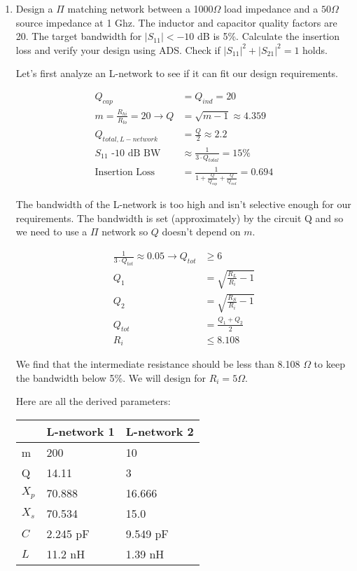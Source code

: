 \begin{enumerate}[label=(\alph*)]
    \item {\color{blue}Design a $\Pi$ matching network between a 1000$\Omega$ load impedance and a $50 \Omega$ source impedance at 1 Ghz. The inductor and capacitor quality factors are 20. The target bandwidth for $|S_{11}| < -10$ dB is 5\%. Calculate the insertion loss and verify your design using ADS. Check if $|S_{11}|^2 + |S_{21}|^2 = 1$ holds.}

    Let's first analyze an L-network to see if it can fit our design requirements.

    \begin{align*}
        Q_{cap} &= Q_{ind} = 20 \\
        m = \frac{R_{hi}}{R_{lo}} = 20 \rightarrow Q &= \sqrt{m-1} \approx 4.359 \\
        Q_{total,L-network} &= \frac{Q}{2} \approx 2.2 \\
        S_{11} \text{ -10 dB BW} &\approx \frac{1}{3 \cdot Q_{total}} = 15\% \\
        \text{Insertion Loss} &= \frac{1}{1 + \frac{Q}{Q_{cap}} + \frac{Q}{Q_{ind}}} = 0.694
    \end{align*}

    The bandwidth of the L-network is too high and isn't selective enough for our requirements.
    The bandwidth is set (approximately) by the circuit Q and so we need to use a $\Pi$ network so $Q$ doesn't depend on $m$.

    \begin{align*}
        \frac{1}{3 \cdot Q_{tot}} \approx 0.05 \rightarrow Q_{tot} &\geq 6 \\
        Q_1 &= \sqrt{\frac{R_L}{R_i} - 1} \\
        Q_2 &= \sqrt{\frac{R_S}{R_i} - 1} \\
        Q_{tot} &= \frac{Q_1 + Q_2}{2} \\
        R_i &\leq 8.108
    \end{align*}

    We find that the intermediate resistance should be less than 8.108 $\Omega$ to keep the bandwidth below 5\%. We will design for $R_i = 5 \Omega$.

    Here are all the derived parameters:

    \begin{center}
    \begin{tabular}{l | l | l |}
        & L-network 1 & L-network 2 \\ \hline
        m & 200 & 10 \\ \hline
        Q & 14.11 & 3 \\ \hline
        $X_p$ & 70.888 & 16.666 \\ \hline
        $X_s$ & 70.534 & 15.0 \\ \hline
        $C$ & 2.245 pF & 9.549 pF \\ \hline
        $L$ & 11.2 nH & 1.39 nH \\ \hline
    \end{tabular}
    \end{center}


\end{enumerate}

